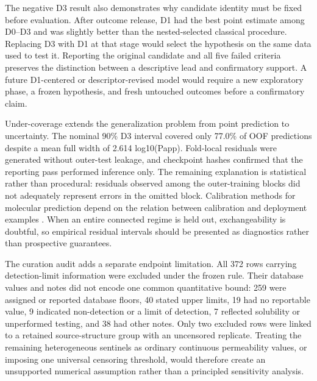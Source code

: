 \documentclass[referee,lineno,pdflatex,sn-vancouver-num]{sn-jnl}
\begin{document}
The negative D3 result also demonstrates why candidate identity must be fixed before evaluation. After outcome release, D1 had the best point estimate among D0--D3 and was slightly better than the nested-selected classical procedure. Replacing D3 with D1 at that stage would select the hypothesis on the same data used to test it. Reporting the original candidate and all five failed criteria preserves the distinction between a descriptive lead and confirmatory support. A future D1-centered or descriptor-revised model would require a new exploratory phase, a frozen hypothesis, and fresh untouched outcomes before a confirmatory claim.

Under-coverage extends the generalization problem from point prediction to uncertainty. The nominal 90\% D3 interval covered only 77.0\% of OOF predictions despite a mean full width of 2.614 log10(Papp). Fold-local residuals were generated without outer-test leakage, and checkpoint hashes confirmed that the reporting pass performed inference only. The remaining explanation is statistical rather than procedural: residuals observed among the outer-training blocks did not adequately represent errors in the omitted block. Calibration methods for molecular prediction depend on the relation between calibration and deployment examples \cite{zhang2019bayesian,hirschfeld2020uncertainty,li2024conformalized}. When an entire connected regime is held out, exchangeability is doubtful, so empirical residual intervals should be presented as diagnostics rather than prospective guarantees.

The curation audit adds a separate endpoint limitation. All 372 rows carrying detection-limit information were excluded under the frozen rule. Their database values and notes did not encode one common quantitative bound: 259 were assigned or reported database floors, 40 stated upper limits, 19 had no reportable value, 9 indicated non-detection or a limit of detection, 7 reflected solubility or unperformed testing, and 38 had other notes. Only two excluded rows were linked to a retained source-structure group with an uncensored replicate. Treating the remaining heterogeneous sentinels as ordinary continuous permeability values, or imposing one universal censoring threshold, would therefore create an unsupported numerical assumption rather than a principled sensitivity analysis.
\end{document}
